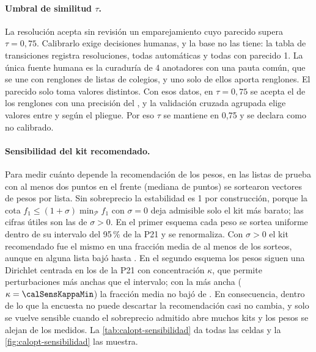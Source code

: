 \paragraph{Umbral de similitud $\tau$.} La resolución acepta sin revisión un
emparejamiento cuyo parecido supera $\tau=0{,}75$. Calibrarlo exige decisiones
humanas, y la base no las tiene: la tabla de transiciones registra
\calTauTransiciones{} resoluciones, todas automáticas y todas con parecido 1.
La única fuente humana es la curaduría de 4 anotadores con una pauta común, que se une con
\calTauPares{} renglones de \calTauListas{} listas de \calTauColegios{}
colegios, y uno solo de ellos aporta \calTauColegioMayor{} renglones. El
parecido solo toma \calTauValores{} valores distintos. Con esos datos, en
$\tau=0{,}75$ se acepta el \calTauAceptada{} de los renglones con una precisión
del \calTauPrecision, y la validación cruzada agrupada elige valores entre
\calTauCVMin{} y \calTauCVMax{} según el pliegue. Por eso $\tau$ se mantiene en
0,75 y se declara como no calibrado.

\paragraph{Sensibilidad del kit recomendado.} Para medir cuánto depende la
recomendación de los pesos, en las \calSensListas{} listas de prueba con al
menos dos puntos en el frente (mediana de \calSensFrenteMediana{} puntos) se
sortearon \calSensPerturbaciones{} vectores de pesos por lista. Sin sobreprecio la estabilidad es 1 por construcción, porque la cota
$f_1\leq(1+\sigma)\min_{\mathcal{P}}f_1$ con $\sigma=0$ deja admisible solo el
kit más barato; las cifras útiles son las de $\sigma>0$. En el primer esquema
cada peso se sortea uniforme dentro de su intervalo del 95\,\% de la P21 y se
renormaliza. Con $\sigma>0$ el kit recomendado fue el mismo en una fracción
media de al menos \calSensICMin{} de los sorteos, aunque en alguna lista bajó
hasta \calSensICMinLista. En el segundo esquema los pesos siguen una Dirichlet
centrada en los de la P21 con concentración $\kappa$, que permite
perturbaciones más anchas que el intervalo; con la más ancha
($\kappa=\calSensKappaMin$) la fracción media no bajó de
\calSensKappaMinEstable. En consecuencia, dentro de lo que la encuesta no
puede descartar la recomendación casi no cambia, y solo se vuelve sensible
cuando el sobreprecio admitido abre muchos kits y los pesos se alejan de los
medidos. La \cref{tab:calopt-sensibilidad} da todas las celdas
y la \cref{fig:calopt-sensibilidad} las muestra.

